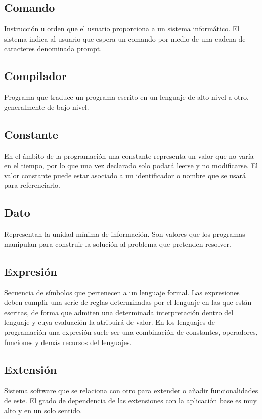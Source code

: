 \subsection {Comando}
Instrucción u orden que el usuario proporciona a un sistema informático. El sistema indica al usuario que espera un comando por medio de una cadena de caracteres denominada prompt. \\

\subsection{Compilador}
Programa que traduce un programa escrito en un lenguaje de alto nivel a otro, generalmente de bajo nivel.  \\

\subsection {Constante}
En el ámbito de la programación una constante representa un valor que no varía en el tiempo, por lo que una vez declarado solo podará leerse y no modificarse. El valor constante 
puede estar asociado a un identificador o nombre que se usará para referenciarlo. \\

\subsection{Dato}
Representan la unidad mínima de información. Son valores que los programas manipulan para construir la solución al problema que pretenden resolver.\\

\subsection{Expresión}
Secuencia de símbolos que pertenecen a un lenguaje formal. Las expresiones deben cumplir una serie de reglas determinadas por el lenguaje 
en las que están escritas, de forma que admiten una determinada interpretación dentro del lenguaje y cuya evaluación la atribuirá de valor. 
En los lenguajes de programación una expresión suele ser una combinación de constantes, operadores, funciones y demás recursos del lenguajes. \\

\subsection {Extensión}
Sistema software que se relaciona con otro para extender o añadir funcionalidades de este. El grado de dependencia de las extensiones con la
aplicación base es muy alto y en un solo sentido. \\

